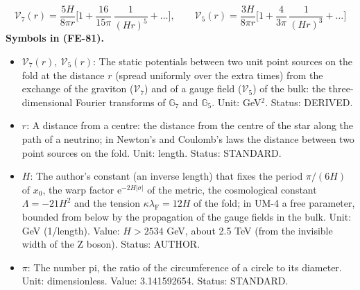 \documentclass[
  10pt,
]{article}
\providecommand{\tightlist}{%
  \setlength{\itemsep}{0pt}\setlength{\parskip}{0pt}}
\begin{document}
\[
\mathcal{V}_7(r) = \frac{5H}{8\pi r}\Big[1 + \frac{16}{15\pi}\,\frac{1}{(Hr)^5} + \dots\Big],\qquad
\mathcal{V}_5(r) = \frac{3H}{8\pi r}\Big[1 + \frac{4}{3\pi}\,\frac{1}{(Hr)^3} + \dots\Big] \tag{FE-81}
\] \textbf{Symbols in (FE-81).}

\begin{itemize}
\tightlist
\item
  \(\mathcal{V}_7(r),\ \mathcal{V}_5(r)\): The static potentials between
  two unit point sources on the fold at the distance \(r\) (spread
  uniformly over the extra times) from the exchange of the graviton
  (\(\mathcal{V}_7\)) and of a gauge field (\(\mathcal{V}_5\)) of the
  bulk: the three-dimensional Fourier transforms of \(\mathbb{G}_7\) and
  \(\mathbb{G}_5\). Unit: GeV\(^2\). Status: DERIVED.
\item
  \(r\): A distance from a centre: the distance from the centre of the
  star along the path of a neutrino; in Newton's and Coulomb's laws the
  distance between two point sources on the fold. Unit: length. Status:
  STANDARD.
\item
  \(H\): The author's constant (an inverse length) that fixes the period
  \(\pi/(6H)\) of \(x_0\), the warp factor
  \(\mathrm{e}^{-2H\lvert\sigma\rvert}\) of the metric, the cosmological
  constant \(\Lambda = -21H^2\) and the tension
  \(\kappa\lambda_{\mathrm{F}} = 12H\) of the fold; in UM-4 a free
  parameter, bounded from below by the propagation of the gauge fields
  in the bulk. Unit: GeV (1/length). Value: \(H > 2534\) GeV, about 2.5
  TeV (from the invisible width of the Z boson). Status: AUTHOR.
\item
  \(\pi\): The number pi, the ratio of the circumference of a circle to
  its diameter. Unit: dimensionless. Value: 3.141592654. Status:
  STANDARD.
\end{itemize}
\end{document}
